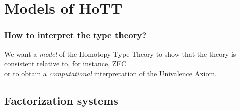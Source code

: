 \documentclass[dvipdfmx]{beamer}
\begin{document}
\section{Models of HoTT}

\begin{frame}
  \frametitle{How to interpret the type theory?}
  We want a {\it model} of the Homotopy Type Theory
  to show that the theory is consistent relative to,
  for instance, ZFC
  \\
  or
  to obtain a {\it computational} interpretation of
  the Univalence Axiom.\nocite{bezem_et_all:LIPIcs:20144628}
\end{frame}


\subsection{Factorization systems}
\end{document}
